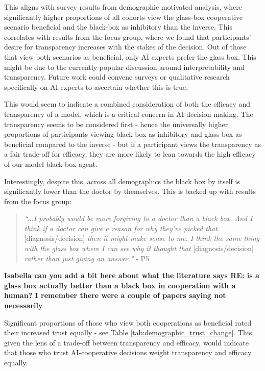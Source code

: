 \documentclass[manuscript,screen,review]{acmart}
\begin{document}
This aligns with survey results from demographic motivated analysis, where significantly higher proportions of all cohorts view the glass-box cooperative scenario beneficial and the black-box as inhibitory than the inverse. This correlates with results from the focus group, where we found that participants' desire for transparency increases with the stakes of the decision. Out of those that view both scenarios as beneficial, only AI experts prefer the glass box. This might be due to the currently popular discussion around interpretability and transparency. Future work could convene surveys or qualitative research specifically on AI experts to ascertain whether this is true.

This would seem to indicate a combined consideration of both the efficacy and transparency of a model, which is a critical concern in AI decision making. The transparency seems to be considered first - hence the universally higher proportions of participants viewing black-box as inhibitory and glass-box as beneficial compared to the inverse - but if a participant views the transparency as a fair trade-off for efficacy, they are more likely to lean towards the high efficacy of our model black-box agent.

Interestingly, despite this, across all demographics the black box by itself is significantly lower than the doctor by themselves. This is backed up with results from the focus group:

\begin{quote}
    \textit{``...I probably would be more forgiving to a doctor than a black box. And I think if a doctor can give a reason for why they’ve picked that} [diagnosis/decision] \textit{then it might make sense to me. I think the same thing with the glass box where I can see why it thought that} [diagnosis/decision] \textit{rather than just giving an answer."} - P5
\end{quote}

\textbf{Isabella can you add a bit here about what the literature says RE: is a glass box actually better than a black box in cooperation with a human? I remember there were a couple of papers saying not necessarily}

Significant proportions of those who view both cooperations as beneficial rated their increased trust equally - see Table \ref{tab:demographic_trust_change}. This, given the lens of a trade-off between transparency and efficacy, would indicate that those who trust AI-cooperative decisions weight transparency and efficacy equally. 
\end{document}
